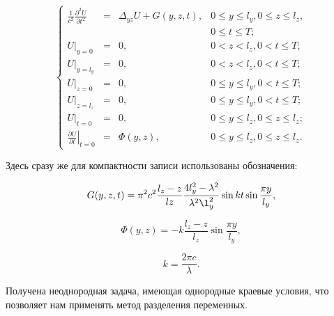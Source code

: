 \begin{equation}
  \label{eq:new_problem}
  \left\{
    \begin{array}{rclr}
      \frac{1}{c^2} \frac{\partial^2 U}{\partial t^2} & = & \Delta_{yz} U + G(y, z, t), & 0 \le y \le l_y, 0 \le z \le l_z, \\
      &&& 0 \le t \le T;\\
      \left. U \right|_{y=0} & = & 0, & 0 < z < l_z, 0 < t \le T; \\
      \left. U \right|_{y=l_y} & = & 0, & 0 < z < l_z, 0 < t \le T; \\ 
      \left. U \right|_{z=0} & = &  0, & 0 \le y \le l_y, 0 < t \le T; \\
      \left. U \right|_{z=l_z} &=& 0, & 0 \le y \le l_y, 0 < t \le T; \\
      \left. U \right|_{t=0} & = & 0, & 0 \le y \le l_z, 0 \le z \le l_z; \\
      \left. \frac{\partial U}{\partial t} \right|_{t=0} &=& \Phi(y, z), & 0 \le y \le l_z, 0 \le z \le l_z.
    \end{array}
  \right.
\end{equation}

Здесь сразу же для компактности записи использованы обозначения:

\begin{equation}
\label{eq:g}
G(y, z, t) = \pi^2 c^2\frac{l_z - z}{lz}\frac{4l_y^2 - \lambda^2}{\lambda^2 \l_y^2}\sin k t \sin\frac{\pi y}{l_y},
\end{equation}

\begin{equation}
\label{eq:phi}
\Phi(y, z) = -k\frac{l_z - z}{l_z}\sin\frac{\pi y}{l_y},
\end{equation}

\begin{equation}
\label{eq:k}
k = \frac{2 \pi c}{\lambda}.
\end{equation}


Получена неоднородная задача, имеющая однородные краевые условия, что
позволяет нам применять метод разделения переменных.
